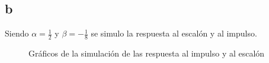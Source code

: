 \documentclass[../../guia1.tex]{subfiles}
\begin{document}
\subsection*{b}
Siendo $\alpha = \frac{1}{2}$ y $\beta = -\frac{1}{8}$ se simulo la respuesta al escalón y al impulso.
\begin{figure}[H]
 \centering

 \caption{Gráficos de la simulación de las respuesta al impulso y al escalón}
 \label{f:ejb}
\end{figure}
\end{document}
